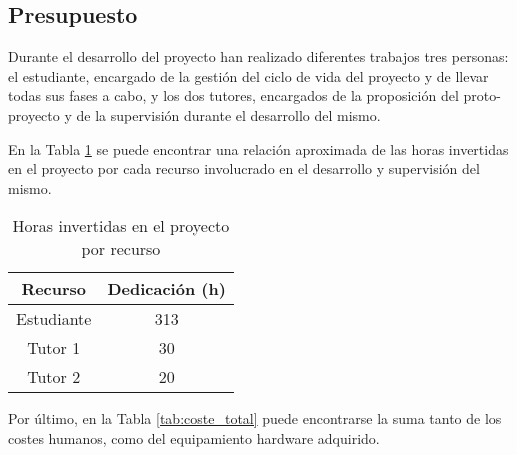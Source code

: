\subsection{Presupuesto}
Durante el desarrollo del proyecto han realizado diferentes trabajos tres personas: el estudiante, encargado de la gestión del ciclo de vida del proyecto y de llevar todas sus fases a cabo, y los dos tutores, encargados de la proposición del proto-proyecto y de la supervisión durante el desarrollo del mismo.

En la Tabla \ref{tab:horas_recurso} se puede encontrar una relación aproximada de las horas invertidas en el proyecto por cada recurso involucrado en el desarrollo y supervisión del mismo.

\begin{table}[H]
  \centering
  \begin{tabular}{ |c|c| }
  \hline
  \textbf{Recurso} & \textbf{Dedicación (h)} \\ 
  \hline
  Estudiante       & 313\\
  \hline
  Tutor 1          & 30\\
  \hline
  Tutor 2          & 20\\
  \hline
  \end{tabular}
  \caption{Horas invertidas en el proyecto por recurso}
  \label{tab:horas_recurso}
\end{table}

Por último, en la Tabla \ref{tab:coste_total} puede encontrarse la suma tanto de los costes humanos, como del equipamiento hardware adquirido.

